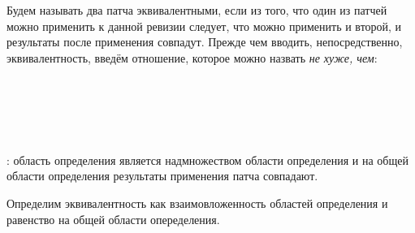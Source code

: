 Будем называть два патча эквивалентными, если из того, что один из
патчей можно применить к данной ревизии следует, что можно применить и
второй, и результаты после применения совпадут. Прежде чем вводить,
непосредственно, эквивалентность, введём отношение, которое можно
назвать \emph{не хуже, чем}:

\begin{code}%
\> \AgdaSymbol{:}  \AgdaSymbol{\{}  \AgdaSymbol{:} \AgdaSymbol{\}}\<%
\\
\>[0]\<[2]%
\>[2] \AgdaSymbol{(} \AgdaSymbol{:}  \AgdaSymbol{)}  \AgdaSymbol{(} \AgdaSymbol{:}  \AgdaSymbol{)}  \<%
\\
\> \AgdaSymbol{\{}\AgdaSymbol{\}}   \AgdaSymbol{=}  \AgdaSymbol{\{} \AgdaSymbol{:} \AgdaSymbol{\}}\<%
\\
\>[0]\<[2]%
\>[2] \AgdaSymbol{(} \AgdaSymbol{:}   \AgdaSymbol{)}   \AgdaSymbol{(}  \AgdaSymbol{)}    \<[43]%
\>[43]\<%
\\
\>[2]\<[4]%
\>[4]\AgdaSymbol{(}        \AgdaSymbol{))}\<%
\end{code}

  : область определения
 является надмножеством области определения
 и на общей области определения результаты применения
патча совпадают.

Определим эквивалентность как взаимовложенность областей определения
и равенство на общей области опеределения.

\begin{code}%
\> \AgdaSymbol{:}  \AgdaSymbol{\{}  \AgdaSymbol{:} \AgdaSymbol{\}}\<%
\\
\>[0]\<[2]%
\>[2] \AgdaSymbol{(} \AgdaSymbol{:}  \AgdaSymbol{)}  \AgdaSymbol{(} \AgdaSymbol{:}  \AgdaSymbol{)}  \<%
\\
\>   \AgdaSymbol{=} \AgdaSymbol{(}  \AgdaSymbol{)}  \AgdaSymbol{(}  \AgdaSymbol{)}\<%
\end{code}

